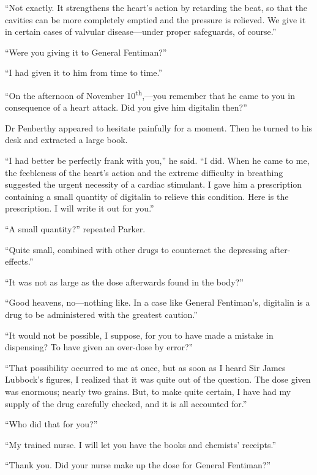 \enquote{Not exactly. It strengthens the heart's action by retarding the beat, so that the cavities can be more completely emptied and the pressure is relieved. We give it in certain cases of valvular disease\allowbreak---\allowbreak under proper safeguards, of course.}

\enquote{Were you giving it to General Fentiman?}

\enquote{I had given it to him from time to time.}

\enquote{On the afternoon of November  10\textsuperscript{th},---you remember that he came to you in consequence of a heart attack. Did you give him digitalin then?}

Dr Penberthy appeared to hesitate painfully for a moment. Then he turned to his desk and extracted a large book.

\enquote{I had better be perfectly frank with you,} he said. \enquote{I did. When he came to me, the feebleness of the heart's action and the extreme difficulty in breathing suggested the urgent necessity of a cardiac stimulant. I gave him a prescription containing a small quantity of digitalin to relieve this condition. Here is the prescription. I will write it out for you.}

\enquote{A small quantity?} repeated Parker.

\enquote{Quite small, combined with other drugs to counteract the depressing after-effects.}

\enquote{It was not as large as the dose afterwards found in the body?}

\enquote{Good heavens, no\allowbreak---\allowbreak nothing like. In a case like General Fentiman's, digitalin is a drug to be administered with the greatest caution.}

\enquote{It would not be possible, I suppose, for you to have made a mistake in dispensing? To have given an over-dose by error?}

\enquote{That possibility occurred to me at once, but as soon as I heard Sir James Lubbock's figures, I realized that it was quite out of the question. The dose given was enormous; nearly two grains. But, to make quite certain, I have had my supply of the drug carefully checked, and it is all accounted for.}

\enquote{Who did that for you?}

\enquote{My trained nurse. I will let you have the books and chemists' receipts.}

\enquote{Thank you. Did your nurse make up the dose for General Fentiman?}

